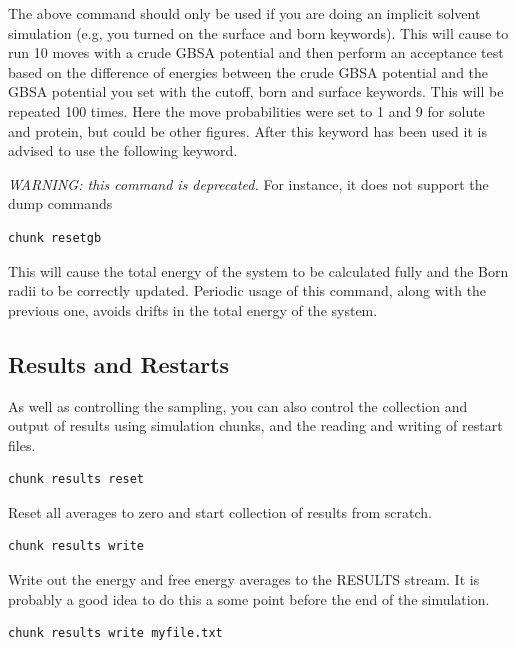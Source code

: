 \documentclass[letterpaper,10pt,english]{sphinxmanual}
\begin{document}
The above command should only be used if you are doing an implicit solvent simulation (e.g, you turned on the surface and born keywords). This will cause to run 10 moves with a crude GBSA potential and then perform an acceptance test based on the difference of energies between the crude GBSA potential and the GBSA potential you set with the cutoff, born and surface keywords. This will be repeated 100 times. Here the move probabilities were set to 1 and 9 for solute and protein, but could be other figures. After this keyword has been used it is advised to use the following keyword.

\emph{WARNING: this command is deprecated.} For instance, it does not support the dump commands

\begin{Verbatim}[commandchars=\\\{\}]
chunk resetgb
\end{Verbatim}

This will cause the total energy of the system to be calculated fully and the Born radii to be correctly updated. Periodic usage of this command, along with the previous one, avoids drifts in the total energy of the system.


\subsection{Results and Restarts}
\label{protoms:results-and-restarts}
As well as controlling the sampling, you can also control the collection and output of results using simulation chunks, and the reading and writing of restart files.

\begin{Verbatim}[commandchars=\\\{\}]
chunk results reset
\end{Verbatim}

Reset all averages to zero and start collection of results from scratch.

\begin{Verbatim}[commandchars=\\\{\}]
chunk results write
\end{Verbatim}

Write out the energy and free energy averages to the RESULTS stream. It is probably a good idea to do this a some point before the end of the simulation.

\begin{Verbatim}[commandchars=\\\{\}]
chunk results write myfile.txt
\end{Verbatim}
\end{document}
